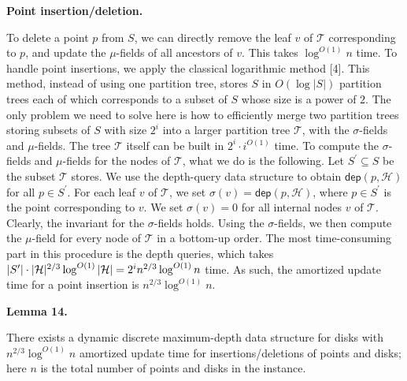 \par
\par
\par\medskip\noindent\textbf{Point insertion/deletion.}\par
To delete a point $p$ from $S$, we can directly remove the leaf $v$ of $\mathcal{T}$ corresponding to $p$, and update the $\mu$-fields of all ancestors of $v$. This takes $\log^{O(1)}n$ time. To handle point insertions, we apply the classical logarithmic method [4]. This method, instead of using one partition tree, stores $S$ in $O(\log|S|)$ partition trees each of which corresponds to a subset of $S$ whose size is a power of $2$. The only problem we need to solve here is how to efficiently merge two partition trees storing subsets of $S$ with size $2^{i}$ into a larger partition tree $\mathcal{T}$, with the $\sigma$-fields and $\mu$-fields. The tree $\mathcal{T}$ itself can be built in $2^{i}\cdot i^{O(1)}$ time. To compute the $\sigma$-fields and $\mu$-fields for the nodes of $\mathcal{T}$, what we do is the following. Let $S^{\prime}\subseteq S$ be the subset $\mathcal{T}$ stores. We use the depth-query data structure to obtain $\mathsf{dep}(p,\mathcal{H})$ for all $p\in S^{\prime}$. For each leaf $v$ of $\mathcal{T}$, we set $\sigma(v)=\mathsf{dep}(p,\mathcal{H})$, where $p\in S^{\prime}$ is the point corresponding to $v$. We set $\sigma(v)=0$ for all internal nodes $v$ of $\mathcal{T}$. Clearly, the invariant for the $\sigma$-fields holds. Using the $\sigma$-fields, we then compute the $\mu$-field for every node of $\mathcal{T}$ in a bottom-up order. The most time-consuming part in this procedure is the depth queries, which takes $|S^{\prime}|\cdot|\mathcal{H}|^{2/3}\log^{O(1)}|\mathcal{H}|=2^{i}n^{2/3}\log^%
{O(1)}n$ time. As such, the amortized update time for a point insertion is $n^{2/3}\log^{O(1)}n$.
\par
\par
\par\medskip\noindent\textbf{Lemma 14.}\par
There exists a dynamic discrete maximum-depth data structure for disks with $n^{2/3}\log^{O(1)}n$ amortized update time for insertions/deletions of points and disks; here $n$ is the total number of points and disks in the instance.
\par
\par
\par
